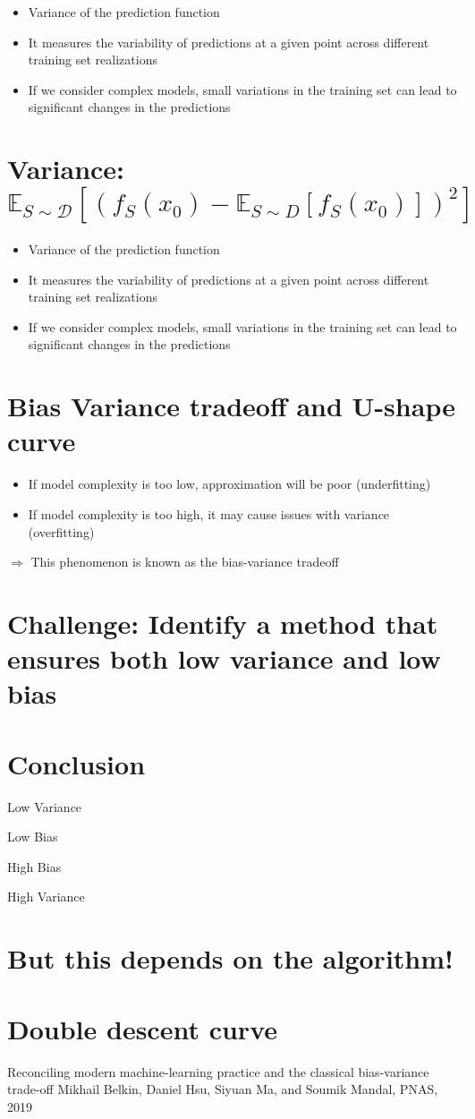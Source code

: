 \begin{itemize}
  \item Variance of the prediction function
  \item It measures the variability of predictions at a given point across different training set realizations
  \item If we consider complex models, small variations in the training set can lead to significant changes in the predictions
\end{itemize}

\section*{Variance: $\mathbb{E}_{S \sim \mathscr{D}}\left[\left(f_{S}\left(x_{0}\right)-\mathbb{E}_{S \sim D}\left[f_{S}\left(x_{0}\right)\right]\right)^{2}\right]$}

\begin{itemize}
  \item Variance of the prediction function
  \item It measures the variability of predictions at a given point across different training set realizations
  \item If we consider complex models, small variations in the training set can lead to significant changes in the predictions
\end{itemize}

\section*{Bias Variance tradeoff and U-shape curve}

\begin{itemize}
  \item If model complexity is too low, approximation will be poor (underfitting)

  \item If model complexity is too high, it may cause issues with variance (overfitting)

\end{itemize}

$\Rightarrow$ This phenomenon is known as the bias-variance tradeoff

\section*{Challenge: Identify a method that ensures both low variance and low bias}
\section*{Conclusion}
Low Variance

Low Bias


High Bias


High Variance

\section*{But this depends on the algorithm!}
\section*{Double descent curve}

Reconciling modern machine-learning practice and the classical bias-variance trade-off Mikhail Belkin, Daniel Hsu, Siyuan Ma, and Soumik Mandal, PNAS, 2019
